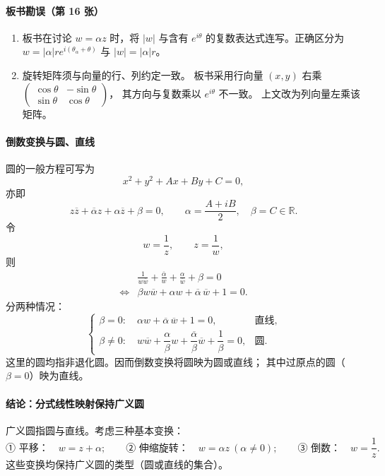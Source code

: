 \paragraph{板书勘误（第 16 张）}
\begin{enumerate}
  \item 板书在讨论 $w=\alpha z$ 时，将 $|w|$ 与含有
  $e^{i\theta}$ 的复数表达式连写。正确区分为
  $w=|\alpha|r e^{i(\theta_\alpha+\theta)}$ 与
  $|w|=|\alpha|r$。
  \item 旋转矩阵须与向量的行、列约定一致。
  板书采用行向量 $(x,y)$ 右乘
  $\left(\begin{smallmatrix}\cos\theta&-\sin\theta\\
  \sin\theta&\cos\theta\end{smallmatrix}\right)$，
  其方向与复数乘以 $e^{i\theta}$ 不一致。
  上文改为列向量左乘该矩阵。
\end{enumerate}



\paragraph{倒数变换与圆、直线}
圆的一般方程可写为
\[
  x^2+y^2+Ax+By+C=0,
\]
亦即
\[
  z\overline z+\overline\alpha z+\alpha\overline z+\beta=0,
  \qquad
  \alpha=\frac{A+iB}{2},\quad \beta=C\in\mathbb R.
\]
令
\[
  w=\frac1z,\qquad z=\frac1w,
\]
则
\begin{align*}
  &\frac{1}{w\overline w}
   +\frac{\overline\alpha}{w}
   +\frac{\alpha}{\overline w}+\beta=0\\
  \iff{}&
  \beta w\overline w+\alpha w+\overline\alpha\,\overline w+1=0.
\end{align*}
分两种情况：
\[
  \begin{cases}
    \beta=0:\quad
      \alpha w+\overline\alpha\,\overline w+1=0,
      &\text{直线},\\[2pt]
    \beta\ne0:\quad
      w\overline w+\dfrac{\alpha}{\beta}w
      +\dfrac{\overline\alpha}{\beta}\overline w
      +\dfrac1{\beta}=0,
      &\text{圆}.
  \end{cases}
\]
这里的圆均指非退化圆。因而倒数变换将圆映为圆或直线；
其中过原点的圆（$\beta=0$）映为直线。

\paragraph{结论：分式线性映射保持广义圆}
广义圆指圆与直线。考虑三种基本变换：
\[
  \text{① 平移：}\quad w=z+\alpha;\qquad
  \text{② 伸缩旋转：}\quad w=\alpha z\ (\alpha\ne0);\qquad
  \text{③ 倒数：}\quad w=\frac1z.
\]
这些变换均保持广义圆的类型（圆或直线的集合）。


